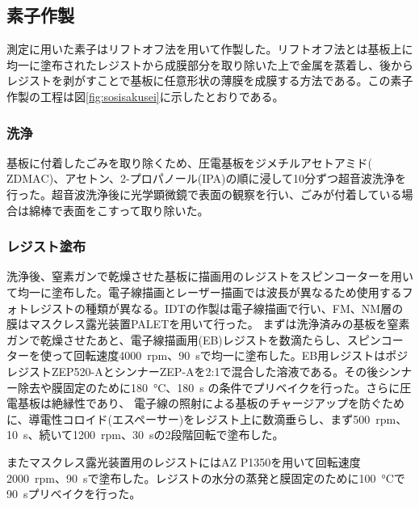 \documentclass[dvipdfmx]{jsreport}
\numberwithin{equation}{chapter}
\numberwithin{table}{chapter}
\begin{document}
\subsection{素子作製}
測定に用いた素子はリフトオフ法を用いて作製した。リフトオフ法とは基板上に均一に塗布されたレジストから成膜部分を取り除いた上で金属を蒸着し、後からレジストを剥がすことで基板に任意形状の薄膜を成膜する方法である。この素子作製の工程は図\ref{fig:sosisakusei}に示したとおりである。
\subsubsection{洗浄}
基板に付着したごみを取り除くため、圧電基板をジメチルアセトアミド($\mathrm{ZDMAC}$)、アセトン、2-プロパノール(IPA)の順に浸して10分ずつ超音波洗浄を行った。超音波洗浄後に光学顕微鏡で表面の観察を行い、ごみが付着している場合は綿棒で表面をこすって取り除いた。
\subsubsection{レジスト塗布}
洗浄後、窒素ガンで乾燥させた基板に描画用のレジストをスピンコーターを用いて均一に塗布した。電子線描画とレーザー描画では波長が異なるため使用するフォトレジストの種類が異なる。IDTの作製は電子線描画で行い、FM、NM層の膜はマスクレス露光装置PALETを用いて行った。
まずは洗浄済みの基板を窒素ガンで乾燥させたあと、電子線描画用(EB)レジストを数滴たらし、スピンコーターを使って回転速度\SI{4000}{rpm}、\SI{90}{s}で均一に塗布した。EB用レジストはポジレジストZEP520-AとシンナーZEP-Aを2:1で混合した溶液である。その後シンナー除去や膜固定のために\SI{180}{\degreeCelsius}、\SI{180}{s}
の条件でプリベイクを行った。さらに圧電基板は絶縁性であり、
電子線の照射による基板のチャージアップを防ぐために、導電性コロイド(エスペーサー)をレジスト上に数滴垂らし、まず\SI{500}{rpm}、\SI{10}{s}、続いて\SI{1200}{rpm}、\SI{30}{s}の2段階回転で塗布した。

またマスクレス露光装置用のレジストにはAZ P1350を用いて回転速度\SI{2000}{rpm}、\SI{90}{s}で塗布した。レジストの水分の蒸発と膜固定のために\SI{100}{\degreeCelsius}で\SI{90}{s}プリベイクを行った。
\end{document}
